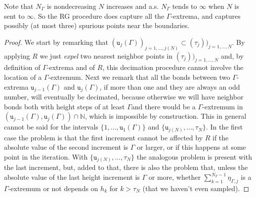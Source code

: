 \documentclass[AHL,Unicode,longabstracts,published]{cedram}
\newcommand{\bbN}{\mathbb{N}}
\newcommand{\gG}{\Gamma}
\renewcommand*\ss{\mathtt{u}}
\newcommand{\tu}{\ss}
\begin{document}
Note that $N_\gG$ is nondecreasing $N$ increases and a.s. $N_\gG$ tends to $\infty$ when $N$ is sent to $\infty$. So the RG procedure does capture all the $\gG$-extrema, and captures possibly (at most three) spurious points near the boundaries.




\begin{proof}
We start by remarking that $(\tu_j(\gG))_{j=1, \dots,j(N)} \subset (\tau_j))_{j=1, \dots, N}$. By applying $R$ we just \emph{expel} two nearest neighbor points in $(\tau_j))_{j=1, \dots, N}$ and, by definition of $\gG$-extrema and of $R$, this decimation procedure cannot involve the location of a $\gG$-extremum. Next we remark that all the bonds between two $\gG$-extrema $\tu_{j-1}(\gG)$ and $\tu_j(\gG)$, if more than one and they are always an odd number, will eventually be decimated, because otherwise we will have neighbor bonds both with height steps of at least $\gG$and there would be a $\gG$-extremum in $(\tu_{j-1}(\gG),\tu_j(\gG))\cap \bbN$, which is impossible by construction. This in general cannot be said for the intervals $\{1, \dots, \tu_1(\gG)\}$ and $\{\tu_{j(N)}, \dots, \tau_N\}$. In the first case the problem is that the first increment cannot be affected by $R$ if the absolute value of the second increment is $\gG$ or larger, or if this happens at some point in the iteration. With $\{\tu_{j(N)}, \dots, \tau_N\}$ the analogous problem is present with the last increment, but, added to that, there is also the problem that, unless the absolute value of the last height increment is $\gG$ or more, whether $\sum_{k=1}^{N_\gG-1} \eta_{\gG,j}$ is a $\gG$-extremum or not depends on $h_k$ for $k> \tau_N$ (that we haven't even sampled).
\end{proof}




\end{document}
